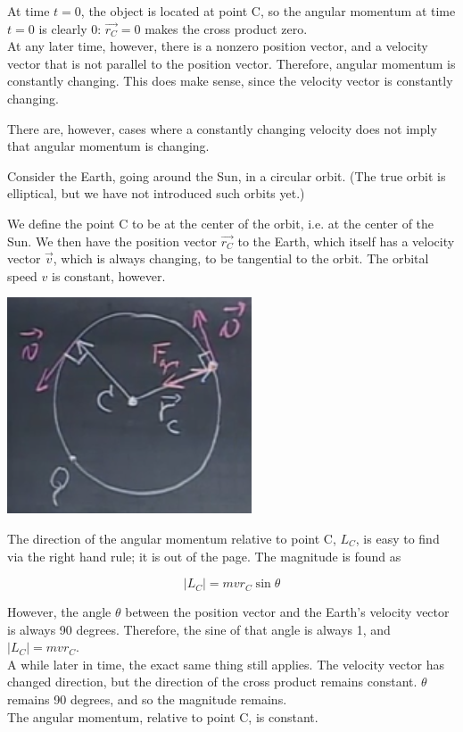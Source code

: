 \documentclass[8.01x]{subfiles}
\begin{document}
At time $t = 0$, the object is located at point C, so the angular momentum at time $t = 0$ is clearly 0: $\vec{r_C} = 0$ makes the cross product zero.\\
At any later time, however, there is a nonzero position vector, and a velocity vector that is not parallel to the position vector. Therefore, angular momentum is constantly changing. This does make sense, since the velocity vector is constantly changing.

There are, however, cases where a constantly changing velocity does not imply that angular momentum is changing.

Consider the Earth, going around the Sun, in a circular orbit. (The true orbit is elliptical, but we have not introduced such orbits yet.)

We define the point C to be at the center of the orbit, i.e. at the center of the Sun. We then have the position vector $\vec{r_C}$ to the Earth, which itself has a velocity vector $\vec{v}$, which is always changing, to be tangential to the orbit. The orbital speed $v$ is constant, however.

\begin{center}
\includegraphics[scale=0.7]{Graphics/lec20_orbit_torque}
\end{center}

The direction of the angular momentum relative to point C, $L_C$, is easy to find via the right hand rule; it is out of the page. The magnitude is found as

\begin{equation}
|L_C| = m v r_C \sin \theta
\end{equation}

However, the angle $\theta$ between the position vector and the Earth's velocity vector is always 90 degrees. Therefore, the sine of that angle is always 1, and $|L_C| = m v r_C$.\\
A while later in time, the exact same thing still applies. The velocity vector has changed direction, but the direction of the cross product remains constant. $\theta$ remains 90 degrees, and so the magnitude remains.\\
The angular momentum, relative to point C, is constant.
\end{document}
